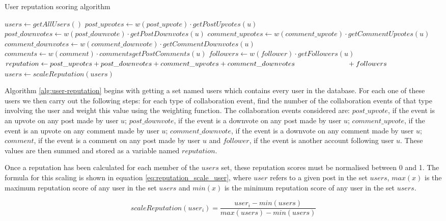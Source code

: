 \newcommand{\myindent}[1]{
\newline\makebox[#1cm]{}
}

\begin{algorithm}[H]
\caption{User reputation scoring algorithm}
\label{alg:user-reputation}
\begin{algorithmic}[1]
\State $users\gets getAllUsers()$
	\State $post\_upvotes\gets w(post\_upvote)\cdot getPostUpvotes(u)$
	\State $post\_downvotes\gets w(post\_downvote)\cdot getPostDownvotes(u)$
	\State $comment\_upvotes\gets w(comment\_upvote)\cdot getCommentUpvotes(u)$
	\State $comment\_downvotes\gets w(comment\_downvote)\cdot getCommentDownvotes(u)$
	\State $comments\gets w(comment)\cdot commentsgetPostComments(u)$
	\State $followers\gets w(follower)\cdot getFollowers(u)$
	\State $reputation\gets post\_upvotes + post\_downvotes + comment\_upvotes + comment\_downvotes \myindent{2.6} + followers$
\EndFor
\State $users\gets scaleReputation(users)$
\end{algorithmic}
\end{algorithm}

\noindent
Algorithm \ref{alg:user-reputation} begins with getting a set named users which contains every user in the database. For each one of these users we then carry out the following steps: for each type of collaboration event, find the number of the collaboration events of that type involving the user and weight this value using the weighting function. The collaboration events considered are: \(post\_upvote\), if the event is an upvote on any post made by user \(u\); \(post\_downvote\), if the event is a downvote on any post made by user \(u\); \(comment\_upvote\), if the event is an upvote on any comment made by user \(u\); \(comment\_downvote\), if the event is a downvote on any comment made by user \(u\); \(comment\), if the event is a comment on any post made by user \(u\) and \(follower\), if the event is another account following user \(u\). These values are then summed and stored as a variable named \(reputation\).

Once a reputation has been calculated for each member of the \(users\) set, these reputation scores must be normalised between 0 and 1. The formula for this scaling is shown in equation \ref{eq:reputation_scale_user}, where \(user\) refers to a given post in the set \(users\), \(max(x)\) is the maximum reputation score of any user in the set \(users\) and \(min(x)\) is the minimum reputation score of any user in the set \(users\).

\begin{equation}
	\label{eq:reputation_scale_user}
	scaleReputation(user_i) = \frac{user_i - min(users)}{max(users) - min(users)}
\end{equation}
